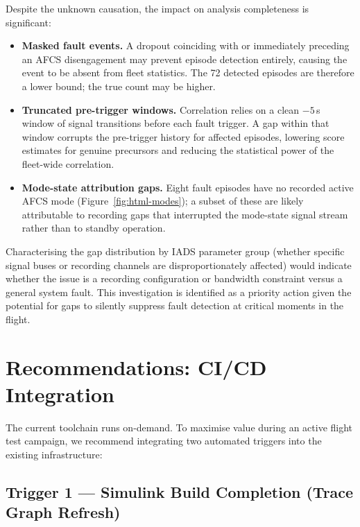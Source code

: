 \documentclass[11pt, letterpaper]{article}
\begin{document}
Despite the unknown causation, the impact on analysis completeness is
significant:

\begin{itemize}[leftmargin=1.6em, itemsep=3pt, topsep=4pt]
  \item \textbf{Masked fault events.} A dropout coinciding with or immediately
    preceding an AFCS disengagement may prevent episode detection entirely,
    causing the event to be absent from fleet statistics. The 72 detected
    episodes are therefore a lower bound; the true count may be higher.
  \item \textbf{Truncated pre-trigger windows.} Correlation relies on a clean
    $-5$\,s window of signal transitions before each fault trigger. A gap within
    that window corrupts the pre-trigger history for affected episodes, lowering
    score estimates for genuine precursors and reducing the statistical power of
    the fleet-wide correlation.
  \item \textbf{Mode-state attribution gaps.} Eight fault episodes have no
    recorded active AFCS mode (Figure~\ref{fig:html-modes}); a subset of these
    are likely attributable to recording gaps that interrupted the mode-state
    signal stream rather than to standby operation.
\end{itemize}

Characterising the gap distribution by IADS parameter group (whether specific
signal buses or recording channels are disproportionately affected) would
indicate whether the issue is a recording configuration or bandwidth constraint
versus a general system fault. This investigation is identified as a priority
action given the potential for gaps to silently suppress fault detection at
critical moments in the flight.

\section{Recommendations: CI/CD Integration}

The current toolchain runs on-demand. To maximise value during an active flight
test campaign, we recommend integrating two automated triggers into the existing
infrastructure:

\subsection{Trigger 1 --- Simulink Build Completion (Trace Graph Refresh)}
\end{document}
